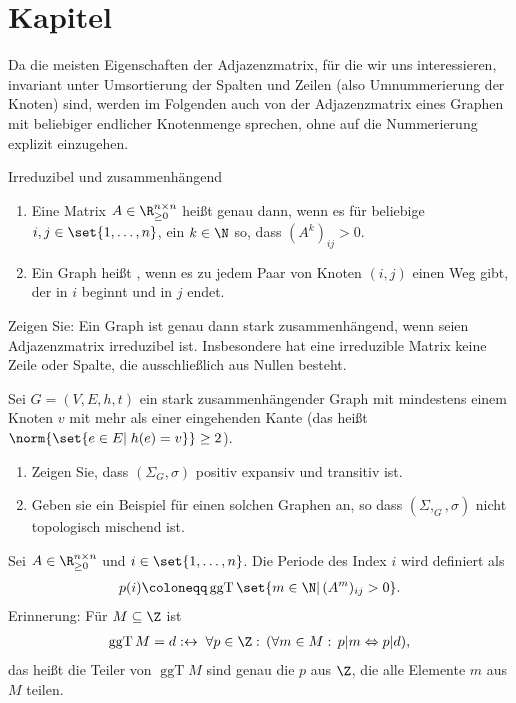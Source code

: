 \section{Kapitel}

\begin{bemerkung}
  Da die meisten Eigenschaften der Adjazenzmatrix, für die wir uns interessieren, invariant unter Umsortierung der Spalten und Zeilen (also Umnummerierung der Knoten) sind, werden im Folgenden auch von der Adjazenzmatrix eines Graphen mit beliebiger endlicher Knotenmenge sprechen, ohne auf die Nummerierung explizit einzugehen. 
\end{bemerkung}
\begin{definition} Irreduzibel und zusammenhängend

  \begin{enumerate}
\enu{\alph}
  \item Eine Matrix $A \in \R_{\geq 0}^{n \times n}$ heißt  genau dann, wenn es für beliebige $i, j \in \set{1, \dots, n}$, ein $k \in \N$ so, dass $(A^k)_{ij} > 0$. 
\item Ein Graph heißt , wenn es zu jedem Paar von Knoten $(i, j)$ einen Weg gibt, der in $i$ beginnt und in $j$ endet.
  \end{enumerate}
\end{definition}
\begin{uebung}
  Zeigen Sie: Ein Graph ist genau dann stark zusammenhängend, wenn seien Adjazenzmatrix irreduzibel ist. Insbesondere hat eine irreduzible Matrix keine Zeile oder Spalte, die ausschließlich aus Nullen besteht. 
\end{uebung}
\begin{uebung}
  Sei $G = (V, E, h, t)$ ein stark zusammenhängender Graph mit mindestens einem Knoten $v$ mit mehr als einer eingehenden Kante (das heißt $\norm{\set{e \in E| \; h(e) = v}}\geq 2$). 
\enu{\alph}
  \begin{enumerate}
  \item Zeigen Sie, dass $(\Sigma_G, \sigma)$ positiv expansiv und transitiv ist. 
  \item Geben sie ein Beispiel für einen solchen Graphen an, so dass $(\Sigma,_G, \sigma)$ nicht topologisch mischend ist.  
  \end{enumerate}
\end{uebung}
\begin{definition}
  Sei $A \in \R_{\geq 0}^{n \times n}$ und $i \in \set{1, \dots, n}$. Die Periode des Index $i$ wird definiert als 
  \begin{align*}
    p(i) \coloneqq \operatorname{ggT}\set{m \in \N| \, (A^m)_{ij} > 0}.
  \end{align*}
Erinnerung: Für $M \subseteq \Z$ ist
\begin{align*}
  \operatorname{ggT} M = d : \leftrightarrow \; \forall p \in \Z: \, (\forall m \in M: \, p |m \Leftrightarrow p |d),
\end{align*}
das heißt die Teiler von $\operatorname{ggT} M$ sind genau die $p$ aus $\Z$, die alle Elemente $m$ aus $M$ teilen. 
\end{definition}
